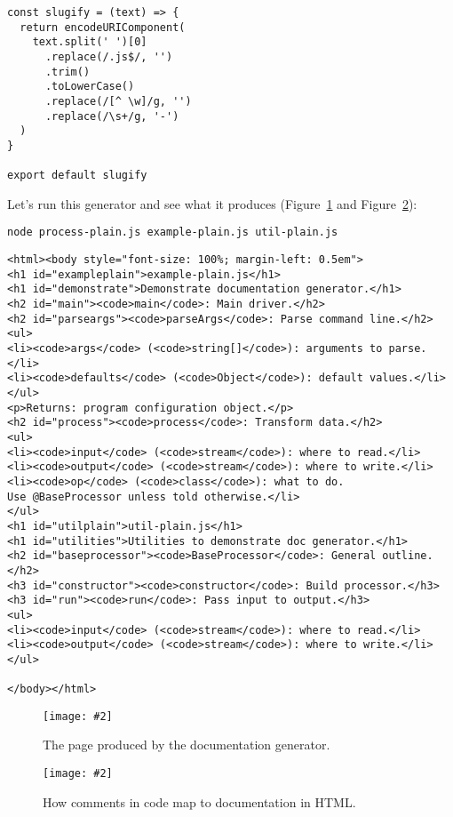 \documentclass[krantzl]{krantz}
\newcommand{\figpdf}[4]{\begin{figure}%
\centering%
\texttt{[image: \#2]}%
\caption{#3}%
\label{#1}%
\end{figure}}
\newcommand{\figref}[1]{Figure~\ref{#1}}
\begin{document}
\begin{lstlisting}[frame=single,frameround=tttt]
const slugify = (text) => {
  return encodeURIComponent(
    text.split(' ')[0]
      .replace(/.js$/, '')
      .trim()
      .toLowerCase()
      .replace(/[^ \w]/g, '')
      .replace(/\s+/g, '-')
  )
}

export default slugify
\end{lstlisting}



Let's run this generator and see what it produces
(\figref{doc-generator-process-plain} and \figref{doc-generator-mapping}):


\begin{lstlisting}[frame=single,frameround=tttt]
node process-plain.js example-plain.js util-plain.js
\end{lstlisting}



\begin{lstlisting}[frame=single,frameround=tttt]
<html><body style="font-size: 100%; margin-left: 0.5em">
<h1 id="exampleplain">example-plain.js</h1>
<h1 id="demonstrate">Demonstrate documentation generator.</h1>
<h2 id="main"><code>main</code>: Main driver.</h2>
<h2 id="parseargs"><code>parseArgs</code>: Parse command line.</h2>
<ul>
<li><code>args</code> (<code>string[]</code>): arguments to parse.</li>
<li><code>defaults</code> (<code>Object</code>): default values.</li>
</ul>
<p>Returns: program configuration object.</p>
<h2 id="process"><code>process</code>: Transform data.</h2>
<ul>
<li><code>input</code> (<code>stream</code>): where to read.</li>
<li><code>output</code> (<code>stream</code>): where to write.</li>
<li><code>op</code> (<code>class</code>): what to do.
Use @BaseProcessor unless told otherwise.</li>
</ul>
<h1 id="utilplain">util-plain.js</h1>
<h1 id="utilities">Utilities to demonstrate doc generator.</h1>
<h2 id="baseprocessor"><code>BaseProcessor</code>: General outline.</h2>
<h3 id="constructor"><code>constructor</code>: Build processor.</h3>
<h3 id="run"><code>run</code>: Pass input to output.</h3>
<ul>
<li><code>input</code> (<code>stream</code>): where to read.</li>
<li><code>output</code> (<code>stream</code>): where to write.</li>
</ul>

</body></html>
\end{lstlisting}


\figpdf{doc-generator-process-plain}{./doc-generator/process-plain.pdf}{The page produced by the documentation generator.}{0.6}

\figpdf{doc-generator-mapping}{./doc-generator/mapping.pdf}{How comments in code map to documentation in HTML.}{0.6}
\end{document}
